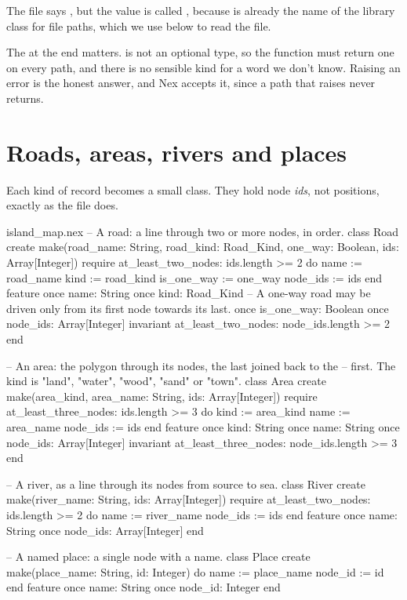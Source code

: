 The file says , but the value is called , because
 is already the name of the library class for file paths, which
we use below to read the file.

The  at the end matters.  is not an optional
type, so the function must return one on every path, and there is no
sensible kind for a word we don't know. Raising an error is the honest
answer, and Nex accepts it, since a path that raises never returns.

\section{Roads, areas, rivers and places}

Each kind of record becomes a small class. They hold node \emph{ids}, not
positions, exactly as the file does.

\begin{append}{island_map.nex}
-- A road: a line through two or more nodes, in order.
class Road
create
  make(road_name: String, road_kind: Road_Kind, one_way: Boolean, ids: Array[Integer])
  require
    at_least_two_nodes: ids.length >= 2
  do
    name := road_name
    kind := road_kind
    is_one_way := one_way
    node_ids := ids
  end
feature
  once name: String
  once kind: Road_Kind
  -- A one-way road may be driven only from its first node towards its last.
  once is_one_way: Boolean
  once node_ids: Array[Integer]
invariant
  at_least_two_nodes: node_ids.length >= 2
end

-- An area: the polygon through its nodes, the last joined back to the
-- first. The kind is "land", "water", "wood", "sand" or "town".
class Area
create
  make(area_kind, area_name: String, ids: Array[Integer])
  require
    at_least_three_nodes: ids.length >= 3
  do
    kind := area_kind
    name := area_name
    node_ids := ids
  end
feature
  once kind: String
  once name: String
  once node_ids: Array[Integer]
invariant
  at_least_three_nodes: node_ids.length >= 3
end

-- A river, as a line through its nodes from source to sea.
class River
create
  make(river_name: String, ids: Array[Integer])
  require
    at_least_two_nodes: ids.length >= 2
  do
    name := river_name
    node_ids := ids
  end
feature
  once name: String
  once node_ids: Array[Integer]
end

-- A named place: a single node with a name.
class Place
create
  make(place_name: String, id: Integer) do
    name := place_name
    node_id := id
  end
feature
  once name: String
  once node_id: Integer
end
\end{append}

